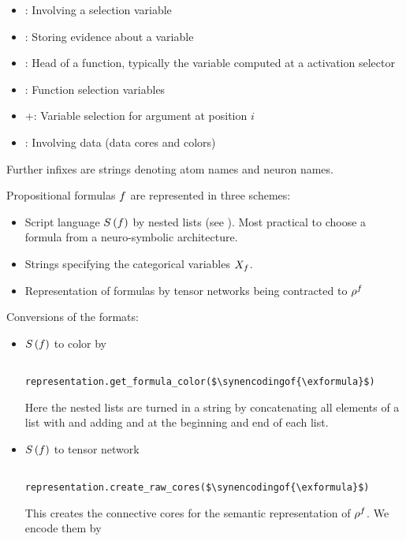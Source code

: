 \begin{itemize}
    \item \selCoreIn: Involving a selection variable
    \item \eviCoreIn: Storing evidence about a variable
    \item \heaIn: Head of a function, typically the variable computed at a activation selector
    \item \funIn: Function selection variables
    \item \posIn+: Variable selection for argument at position $i$
    \item \datIn: Involving data (data cores and colors)
\end{itemize}

Further infixes are strings denoting atom names and neuron names.



Propositional formulas $f$ are represented in three schemes:
\begin{itemize}
    \item Script language $S\left(f\right)$ by nested lists (see ).
    Most practical to choose a formula from a neuro-symbolic architecture.
    \item Strings specifying the categorical variables $X_{f}$.
    \item Representation of formulas by tensor networks being contracted to $\rho^{f}$
\end{itemize}

Conversions of the formats:
\begin{itemize}
    \item $S\left(f\right)$ to color by
    \begin{lstlisting}
			representation.get_formula_color($\synencodingof{\exformula}$)
    \end{lstlisting}
    Here the nested lists are turned in a string by concatenating all elements of a list with \stringof{\_} and adding \stringof{[} and \stringof{]} at the beginning and end of each list.
    \item  $S\left(f\right)$ to tensor network
    \begin{lstlisting}
			representation.create_raw_cores($\synencodingof{\exformula}$)
    \end{lstlisting}
    This creates the connective cores for the semantic representation of $\rho^{f}$.
    We encode them by
\end{itemize}


